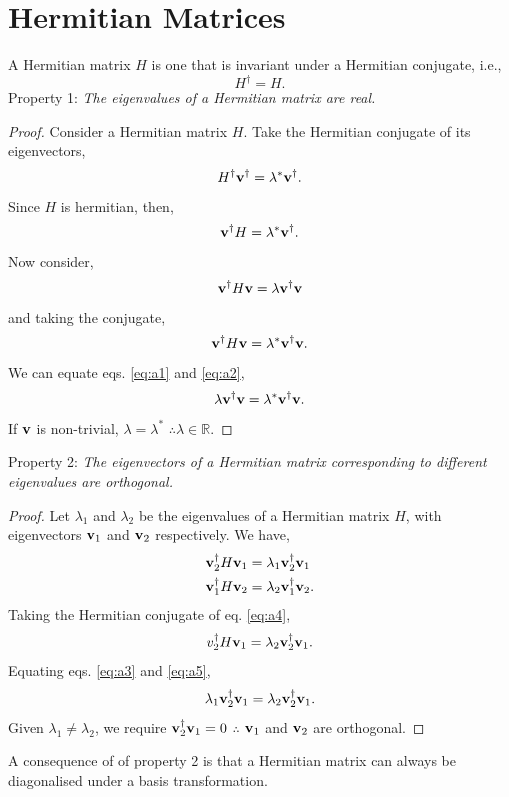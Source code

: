 \documentclass{book}
\begin{document}
\section{Hermitian Matrices}
A Hermitian matrix $H$ is one that is invariant under a Hermitian conjugate, i.e.,
\begin{equation}
	H^{\dag} = H.
\end{equation}
Property 1: \textit{The eigenvalues of a Hermitian matrix are real.}
\begin{proof}
	Consider a Hermitian matrix $H$. Take the Hermitian conjugate of its eigenvectors,
	\begin{equation}
		H^{\dag}\vb{v}^{\dag} = \lambda^*\vb{v}^{\dag}.
	\end{equation}
	Since $H$ is hermitian, then,
	\begin{equation}
		\vb{v}^{\dag}H = \lambda^*\vb{v}^{\dag}.
	\end{equation}
	Now consider,
	\begin{equation}
		\vb{v}^{\dag}H\vb{v} = \lambda\vb{v}^{\dag}\vb{v} \label{eq:a1}
	\end{equation}
	and taking the conjugate,
	\begin{equation}
		\vb{v}^{\dag}H\vb{v} = \lambda^*\vb{v}^{\dag}\vb{v}. \label{eq:a2}
	\end{equation}
	We can equate eqs. \eqref{eq:a1} and \eqref{eq:a2},
	\begin{equation}
		\lambda\vb{v}^{\dag}\vb{v} = \lambda^*\vb{v}^{\dag}\vb{v}.
	\end{equation}
	If $\vb{v}$ is non-trivial, $\lambda = \lambda^{*}$ $\therefore \lambda \in \mathbb{R}$.
\end{proof}\noindent
Property 2: \textit{The eigenvectors of a Hermitian matrix corresponding to different eigenvalues are orthogonal.}
\begin{proof}
	Let $\lambda_1$ and $\lambda_2$ be the eigenvalues of a Hermitian matrix $H$, with eigenvectors $\vb{v}_1$ and $\vb{v}_2$ respectively. We have,
	\begin{align}
		\vb{v}_2^{\dag}H\vb{v}_1 &= \lambda_1 \vb{v}_2^{\dag}\vb{v}_1 \label{eq:a3}\\
		\vb{v}_1^{\dag}H\vb{v}_2 &= \lambda_2 \vb{v}_1^{\dag}\vb{v}_2.\label{eq:a4}
	\end{align}
	Taking the Hermitian conjugate of eq. \eqref{eq:a4}, 
	\begin{equation}
		v_2^{\dag}H\vb{v}_1 = \lambda_2\vb{v}_2^{\dag}\vb{v}_1.\label{eq:a5}
	\end{equation}
	Equating eqs. \eqref{eq:a3} and \eqref{eq:a5},
	\begin{equation}
		\lambda_1\vb{v}_2^{\dag}\vb{v}_1 = \lambda_2\vb{v}_2^{\dag}\vb{v}_1.
	\end{equation}
	Given $\lambda_1 \neq \lambda_2$, we require $\vb{v}_2^{\dag}\vb{v}_1 = 0$ $\therefore$ $\vb{v}_1$ and $\vb{v}_2$ are orthogonal.
\end{proof} \noindent
A consequence of of property 2 is that a Hermitian matrix can always be diagonalised under a basis transformation.
\end{document}
